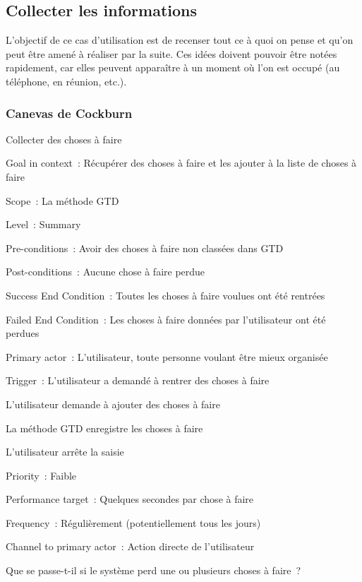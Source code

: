 
\subsection{Collecter les informations}
L'objectif de ce cas d'utilisation est de recenser tout ce à quoi on pense et qu'on peut être amené à réaliser par la suite. Ces idées doivent pouvoir être notées rapidement, car elles peuvent apparaître à un moment où l'on est occupé (au téléphone, en réunion, etc.).

\subsubsection{Canevas de Cockburn}

\begin{usecase}{Collecter des choses à faire}
\begin{information}
\item[Goal in context~:] Récupérer des choses à faire et les ajouter à la liste de choses à faire
\item[Scope~:] La méthode GTD
\item[Level~:] Summary
\item[Pre-conditions~:] Avoir des choses à faire non classées dans GTD
\item[Post-conditions~:] Aucune chose à faire perdue
\item[Success End Condition~:] Toutes les choses à faire voulues ont été rentrées
\item[Failed End Condition~:] Les choses à faire données par l'utilisateur ont été perdues
\item[Primary actor~:] L'utilisateur, toute personne voulant être mieux organisée
\item[Trigger~:] L'utilisateur a demandé à rentrer des choses à faire
\\
\end{information}
\begin{scenario}
\item L'utilisateur demande à ajouter des choses à faire
\item La méthode GTD enregistre les choses à faire
\item L'utilisateur arrête la saisie
\\
\end{scenario}
\begin{relatedinformation}
\item[Priority~:] Faible
\item[Performance target~:] Quelques secondes par chose à faire
\item[Frequency~:] Régulièrement (potentiellement tous les jours)
\item[Channel to primary actor~:] Action directe de l'utilisateur
\\
\end{relatedinformation}
\begin{openissues}
\item Que se passe-t-il si le système perd une ou plusieurs choses à faire~?
\\
\end{openissues}
\end{usecase}

